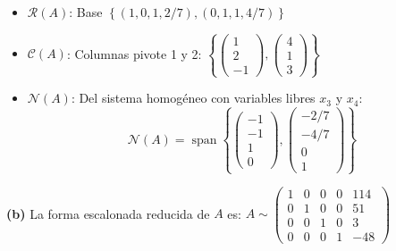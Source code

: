 \begin{prob}
\begin{myproof}
\begin{itemize}
    \item $\mathcal{R}(A)$: Base $\left\{ (1, 0, 1, 2/7), (0, 1, 1, 4/7) \right\}$
    \item $\mathcal{C}(A)$: Columnas pivote 1 y 2: $\left\{ \begin{pmatrix}1\\2\\-1\end{pmatrix}, \begin{pmatrix}4\\1\\3\end{pmatrix} \right\}$
    \item $\mathcal{N}(A)$: Del sistema homogéneo con variables libres $x_3$ y $x_4$:
    $$\mathcal{N}(A) = \operatorname{span}\left\{ \begin{pmatrix}-1\\-1\\1\\0\end{pmatrix}, \begin{pmatrix}-2/7\\-4/7\\0\\1\end{pmatrix} \right\}$$
\end{itemize}

\textbf{(b)} La forma escalonada reducida de $A$ es: $A \sim \begin{pmatrix} 1 & 0 & 0 & 0 & 114 \\ 0 & 1 & 0 & 0 & 51 \\ 0 & 0 & 1 & 0 & 3 \\ 0 & 0 & 0 & 1 & -48 \end{pmatrix}$


\end{myproof}
\end{prob}
